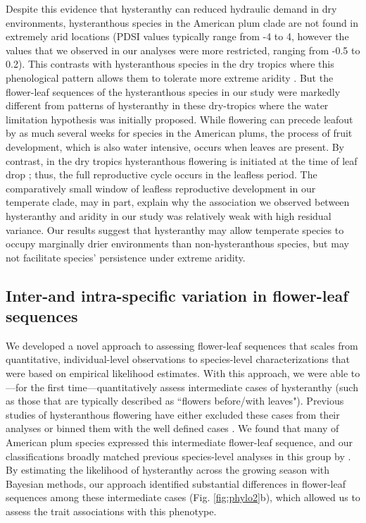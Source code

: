 \documentclass{article}[12pt]
\begin{document}
{Despite this evidence that hysteranthy can reduced hydraulic demand in dry environments, hysteranthous species in the American plum clade are not found in extremely arid locations (PDSI values typically range from -4 to 4, however the values that we observed in our analyses were more restricted, ranging from -0.5 to 0.2). This contrasts with hysteranthous species in the dry tropics where this phenological pattern allows them to tolerate more extreme aridity \citep{Franklin2016}. But the flower-leaf sequences of the hysteranthous species in our study were markedly different from patterns of hysteranthy in these dry-tropics where the water limitation hypothesis was initially proposed. While flowering can precede leafout by as much several weeks for species in the American plums, the process of fruit development, which is also water intensive, occurs when leaves are present. By contrast, in the dry tropics hysteranthous flowering is initiated at the time of leaf drop \citep{Borchert1983,Franklin2016}; thus, the full reproductive cycle occurs in the leafless period. The comparatively small window of leafless reproductive development in our temperate clade, may in part, explain why the association we observed between hysteranthy and aridity in our study was relatively weak with high residual variance. Our results suggest that hysteranthy may allow temperate species to occupy marginally drier environments than non-hysteranthous species, but may not facilitate species' persistence under extreme aridity. 

\subsection*{Inter-and intra-specific variation in flower-leaf sequences} %
We developed a novel approach to assessing flower-leaf sequences that scales from quantitative, individual-level observations to species-level characterizations that were based on empirical likelihood estimates. With this approach, we were able to---for the first time---quantitatively assess intermediate cases of hysteranthy (such as those that are typically described as ``flowers before/with leaves"). Previous studies of hysteranthous flowering have either excluded these cases from their analyses  \citep[e.g.;][]{Gougherty2018} or binned them with the well defined cases \citep[e.g.;][]{Buonaiuto2020}. We found that many of American plum species expressed this intermediate flower-leaf sequence, and our classifications broadly matched previous species-level analyses in this group by \citet{Shaw:2004aa}. By estimating the likelihood of hysteranthy across the growing season with Bayesian methods, our approach identified substantial differences in flower-leaf sequences among these intermediate cases (Fig. \ref{fig:phylo2}b), which allowed us to assess the trait associations with this phenotype.

}
\end{document}
